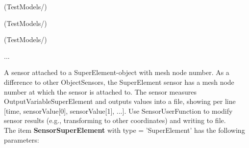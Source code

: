 \item {} (TestModels/)
\item {} (TestModels/)
\item {} (TestModels/)
\item  ...

\ei

%
\newpage

\label{sec:item:SensorSuperElement}
A sensor attached to a SuperElement-object with mesh node number. As a difference to other ObjectSensors, the SuperElement sensor has a mesh node number at which the sensor is attached to. The sensor measures OutputVariableSuperElement and outputs values into a file, showing per line [time, sensorValue[0], sensorValue[1], ...]. Use SensorUserFunction to modify sensor results (e.g., transforming to other coordinates) and writing to file.\vspace{12pt}
 \\\vspace{12pt} \noindent The item {\bf SensorSuperElement} with type = 'SuperElement' has the following parameters:\vspace{-1cm}\\ 
